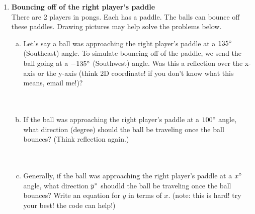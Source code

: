 \documentclass[11pt]{article}
\begin{document}
\begin{enumerate}
\item \textbf{Bouncing off of the right player's paddle}\\
There are 2 players in pongs. Each has a paddle. The balls can bounce off these paddles. Drawing pictures may help solve the problems below.
\begin{enumerate}[a.]
\item Let's say a ball was approaching the right player's paddle  at a $135\degree$ (Southeast) angle. To simulate bouncing off of the paddle, we send the ball going at a $-135 \degree$ (Southwest) angle. Was this a reflection over the x-axis or the y-axis (think 2D coordinate! if you don't know what this means, email me!)?\\\\\\
\item If the ball was approaching the right player's paddle at a $100 \degree$ angle, what direction (degree) should the ball be traveling once the ball bounces? (Think reflection again.)\\\\\\
\item Generally, if the ball was approaching the right player's paddle at a $x \degree$ angle, what direction $y \degree$ shoudld the ball be traveling once the ball bounces? Write an equation for $y$ in terms of $x$. (note: this is hard! try your best! the code can help!)\\\\\\\\\\\\\\\\\\\\\\\\\\\\\\\\\\\\\\\\\\\\\\\\\\\\
\end{enumerate}
\end{enumerate}
\end{document}
